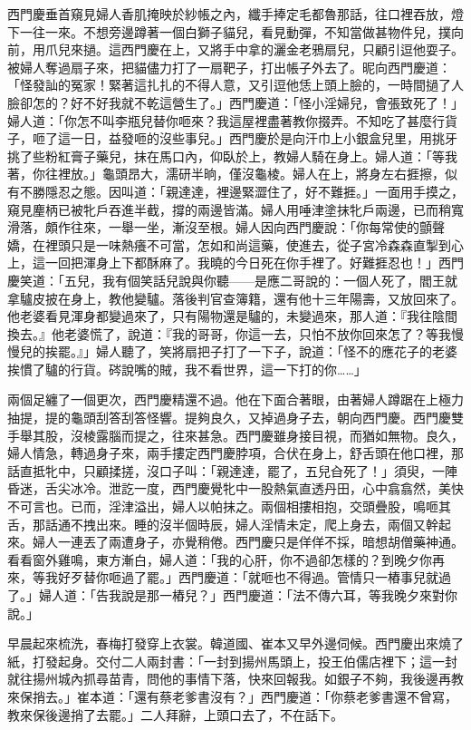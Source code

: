 西門慶垂首窺見婦人香肌掩映於紗帳之內，纖手捧定毛都魯那話，往口裡吞放，燈下一往一來。不想旁邊蹲著一個白獅子貓兒，看見動彈，不知當做甚物件兒，撲向前，用爪兒來撾。這西門慶在上，又將手中拿的灑金老鴉扇兒，只顧引逗他耍子。被婦人奪過扇子來，把貓儘力打了一扇靶子，打出帳子外去了。昵向西門慶道：「怪發訕的冤家！緊著這扎扎的不得人意，又引逗他恁上頭上臉的，一時間撾了人臉卻怎的？好不好我就不乾這營生了。」西門慶道：「怪小淫婦兒，會張致死了！」婦人道：「你怎不叫李瓶兒替你咂來？我這屋裡盡著教你掇弄。不知吃了甚麼行貨子，咂了這一日，益發咂的沒些事兒。」西門慶於是向汗巾上小銀盒兒里，用挑牙挑了些粉紅膏子藥兒，抹在馬口內，仰臥於上，教婦人騎在身上。婦人道：「等我𢵞著，你往裡放。」龜頭昂大，濡研半晌，僅沒龜棱。婦人在上，將身左右捱擦，似有不勝隱忍之態。因叫道：「親達達，裡邊緊澀住了，好不難捱。」一面用手摸之，窺見麈柄已被牝戶吞進半截，撐的兩邊皆滿。婦人用唾津塗抹牝戶兩邊，已而稍寬滑落，頗作往來，一舉一坐，漸沒至根。婦人因向西門慶說：「你每常使的顫聲嬌，在裡頭只是一味熱癢不可當，怎如和尚這藥，使進去，從子宮冷森森直掣到心上，這一回把渾身上下都酥麻了。我曉的今日死在你手裡了。好難捱忍也！」西門慶笑道：「五兒，我有個笑話兒說與你聽——是應二哥說的：一個人死了，閻王就拿驢皮披在身上，教他變驢。落後判官查簿籍，還有他十三年陽壽，又放回來了。他老婆看見渾身都變過來了，只有陽物還是驢的，未變過來，那人道：『我往陰間換去。』他老婆慌了，說道：『我的哥哥，你這一去，只怕不放你回來怎了？等我慢慢兒的挨罷。』」婦人聽了，笑將扇把子打了一下子，說道：「怪不的應花子的老婆挨慣了驢的行貨。硶說嘴的賊，我不看世界，這一下打的你……」

兩個足纏了一個更次，西門慶精還不過。他在下面合著眼，由著婦人蹲踞在上極力抽提，提的龜頭刮答刮答怪響。提夠良久，又掉過身子去，朝向西門慶。西門慶雙手舉其股，沒棱露腦而提之，往來甚急。西門慶雖身接目視，而猶如無物。良久，婦人情急，轉過身子來，兩手摟定西門慶脖項，合伏在身上，舒舌頭在他口裡，那話直抵牝中，只顧揉搓，沒口子叫：「親達達，罷了，五兒㒲死了！」須臾，一陣昏迷，舌尖冰冷。泄訖一度，西門慶覺牝中一股熱氣直透丹田，心中翕翕然，美快不可言也。已而，淫津溢出，婦人以帕抹之。兩個相摟相抱，交頭疊股，鳴咂其舌，那話通不拽出來。睡的沒半個時辰，婦人淫情未定，爬上身去，兩個又幹起來。婦人一連丟了兩遭身子，亦覺稍倦。西門慶只是佯佯不採，暗想胡僧藥神通。看看窗外雞鳴，東方漸白，婦人道：「我的心肝，你不過卻怎樣的？到晚夕你再來，等我好歹替你咂過了罷。」西門慶道：「就咂也不得過。管情只一樁事兒就過了。」婦人道：「告我說是那一樁兒？」西門慶道：「法不傳六耳，等我晚夕來對你說。」

早晨起來梳洗，春梅打發穿上衣裳。韓道國、崔本又早外邊伺候。西門慶出來燒了紙，打發起身。交付二人兩封書：「一封到揚州馬頭上，投王伯儒店裡下；這一封就往揚州城內抓尋苗青，問他的事情下落，快來回報我。如銀子不夠，我後邊再教來保捎去。」崔本道：「還有蔡老爹書沒有？」西門慶道：「你蔡老爹書還不曾寫，教來保後邊捎了去罷。」二人拜辭，上頭口去了，不在話下。


